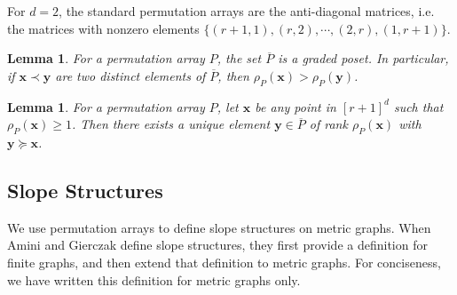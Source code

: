 \documentclass{amsart}
\newtheorem{lemma}[theorem]{Lemma}
\begin{document}
	For $d=2$, the standard permutation arrays are the anti-diagonal matrices, i.e. the matrices with nonzero elements $\{(r+1,1), (r,2), \cdots, (2,r),(1,r+1)\}$.
	
	\begin{lemma}\cite[Proposition~2.14]{amini2022limit}
		\label{Lem:Jumps-Form-Graded-Poset}
		For a permutation array $P$, the set $\overline{P}$ is a graded poset. In particular, if $\mathbf{x} \prec \mathbf{y}$ are two distinct elements of $\overline{P}$, then $\rho_P(\mathbf{x}) > \rho_P(\mathbf{y})$.
	\end{lemma}
	
	\begin{lemma}\cite[Lemma~5.12]{amini2022limit}
		\label{Lem:Jump-of-Same-Rank}
		For a permutation array $P$, let $\mathbf{x}$ be any point in $[r+1]^d$ such that $\rho_P(\mathbf{x}) \geq 1$. Then there exists a unique element $\mathbf{y} \in \overline{P}$ of rank $\rho_P(\mathbf{x})$ with $\mathbf{y} \succeq \mathbf{x}$.
	\end{lemma}
	
	\subsection{Slope Structures}
	\label{Subsec:Slope-Structures}
	
	We use permutation arrays to define slope structures on metric graphs. When Amini and Gierczak define slope structures, they first provide a definition for finite graphs, and then extend that definition to metric graphs. For conciseness, we have written this definition for metric graphs only.
	
\end{document}
